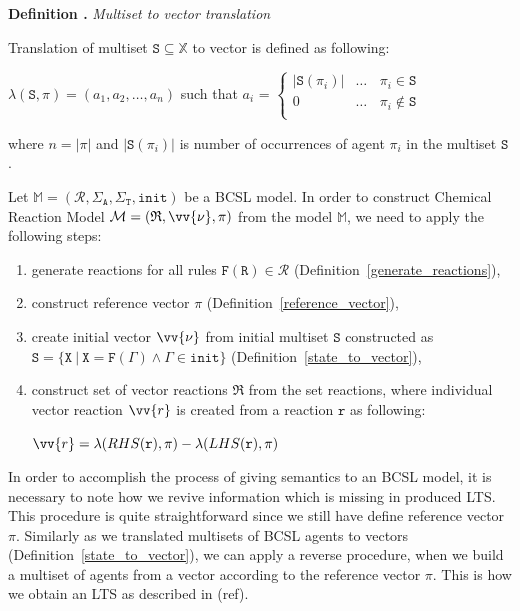 \documentclass[12pt]{fithesis2}
\newcounter{counter}[section]
\renewcommand{\thecounter}{\thesection.\arabic{counter}}
\newenvironment{definition}[1]{\bigskip\refstepcounter{counter}\noindent\textbf{Definition \thecounter } \textit{#1} \par\nopagebreak}{\bigskip}
\begin{document}
\begin{definition}{Multiset to vector translation}\label{state_to_vector}
Translation of multiset $\mathtt{S} \subseteq \mathds{X}$ to vector is defined as following:
\begin{center}
$\lambda(\mathtt{S}, \pi) = (a_1, a_2, \ldots, a_n)$ such that 
$a_i$ =
  $\begin{cases}
  |\mathtt{S}(\pi_i)| & \ldots~~~~ \pi_i \in \mathtt{S}\\
  0 & \ldots~~~~ \pi_i \not\in \mathtt{S}\\
  \end{cases}
  $
\end{center}
\hspace{15pt} where $n = |\pi|$ and $|\mathtt{S}(\pi_i)|$ is number of occurrences of agent $\pi_i$ in the multiset $\mathtt{S}$.
\end{definition}

Let $\mathds{M} = (\mathcal{R}, \Sigma_\mathtt{A}, \Sigma_\mathtt{T}, \mathtt{init})$ be a BCSL model. In order to construct Chemical Reaction Model $\mathcal{M} = (\mathfrak{R}, \vv{\nu}, \pi)$ from the model $\mathds{M}$, we need to apply the following steps:

\begin{enumerate}
\item generate reactions for all rules $\mathtt{F}(\mathtt{R}) \in \mathcal{R}$ (Definition~\ref{generate_reactions}),
\item construct reference vector $\pi$ (Definition~\ref{reference_vector}),
\item create initial vector $\vv{\nu}$ from initial multiset $\mathtt{S}$ constructed as $\mathtt{S} = \{ \mathtt{X} ~|~ \mathtt{X} = \mathtt{F}(\Gamma) \wedge \Gamma \in \mathtt{init} \}$ (Definition~\ref{state_to_vector}),
\item construct set of vector reactions $\mathfrak{R}$ from the set reactions, where individual vector reaction $\vv{r}$ is created from a reaction $\mathtt{r}$ as following:

\begin{center}
$\vv{r} = \lambda(RHS(\mathtt{r}), \pi) - \lambda(LHS(\mathtt{r}), \pi)$
\end{center}

\end{enumerate}

In order to accomplish the process of giving semantics to an BCSL model, it is necessary to note how we revive information which is missing in produced LTS. This procedure is quite straightforward since we still have define reference vector $\pi$. Similarly as we translated multisets of BCSL agents to vectors (Definition~\ref{state_to_vector}), we can apply a reverse procedure, when we build a multiset of agents from a vector according to the reference vector $\pi$. This is how we obtain an LTS as described in (ref).  
\end{document}
